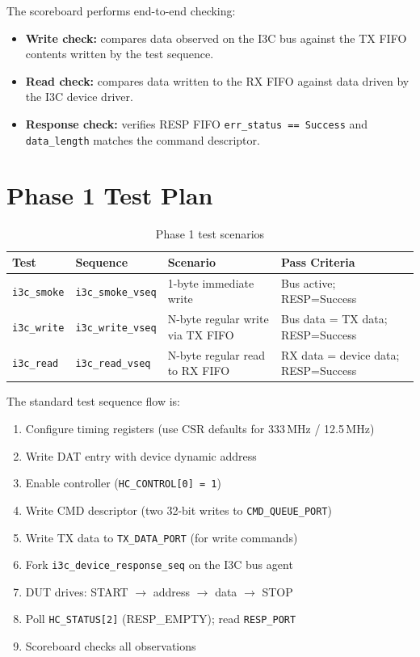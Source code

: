\documentclass[12pt, a4paper, oneside]{report}
\begin{document}
The scoreboard performs end-to-end checking:
\begin{itemize}
  \item \textbf{Write check:} compares data observed on the I3C bus against the TX
        FIFO contents written by the test sequence.
  \item \textbf{Read check:} compares data written to the RX FIFO against data
        driven by the I3C device driver.
  \item \textbf{Response check:} verifies RESP FIFO \texttt{err\_status\,==\,Success}
        and \texttt{data\_length} matches the command descriptor.
\end{itemize}

\section{Phase 1 Test Plan}

\begin{table}[H]
\centering
\caption{Phase 1 test scenarios}
\label{tab:phase1_tests}
\begin{tabularx}{\textwidth}{L{2.5cm} L{3.5cm} L{3.5cm} L{3cm}}
\toprule
\textbf{Test} & \textbf{Sequence} & \textbf{Scenario} & \textbf{Pass Criteria} \\
\midrule
\texttt{i3c\_smoke} & \texttt{i3c\_smoke\_vseq} & 1-byte immediate write & Bus active; RESP=Success \\
\texttt{i3c\_write} & \texttt{i3c\_write\_vseq} & N-byte regular write via TX FIFO & Bus data = TX data; RESP=Success \\
\texttt{i3c\_read}  & \texttt{i3c\_read\_vseq}  & N-byte regular read to RX FIFO  & RX data = device data; RESP=Success \\
\bottomrule
\end{tabularx}
\end{table}

The standard test sequence flow is:

\begin{enumerate}
  \item Configure timing registers (use CSR defaults for 333\,MHz / 12.5\,MHz)
  \item Write DAT entry with device dynamic address
  \item Enable controller (\texttt{HC\_CONTROL[0]\,=\,1})
  \item Write CMD descriptor (two 32-bit writes to \texttt{CMD\_QUEUE\_PORT})
  \item Write TX data to \texttt{TX\_DATA\_PORT} (for write commands)
  \item Fork \texttt{i3c\_device\_response\_seq} on the I3C bus agent
  \item DUT drives: START $\rightarrow$ address $\rightarrow$ data $\rightarrow$ STOP
  \item Poll \texttt{HC\_STATUS[2]} (RESP\_EMPTY); read \texttt{RESP\_PORT}
  \item Scoreboard checks all observations
\end{enumerate}
\end{document}
